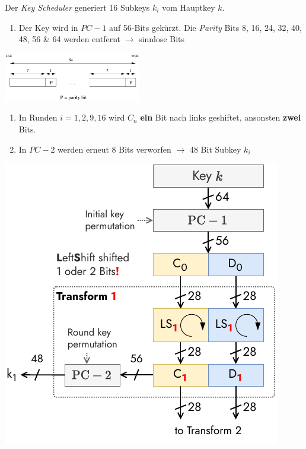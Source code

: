 \documentclass[
  10pt,
  a4paper,
]{article}
\providecommand{\tightlist}{%
  \setlength{\itemsep}{0pt}\setlength{\parskip}{0pt}}\usepackage{longtable,booktabs,array}
\begin{document}
\begin{multicols*}{2}
Der \emph{Key Scheduler} generiert 16 Subkeys \(k_i\) vom Hauptkey
\(k\).

\begin{enumerate}
\def\labelenumi{\arabic{enumi}.}
\tightlist
\item
  Der Key wird in \(PC-1\) auf 56-Bits gekürzt. Die \emph{Parity} Bits
  8, 16, 24, 32, 40, 48, 56 \& 64 werden entfernt \(\rightarrow\)
  sinnlose Bits
\end{enumerate}

\begin{center}
\includegraphics[width=6cm,height=\textheight]{images/crypto/initial_key_permutation.png}
\end{center}

\begin{enumerate}
\def\labelenumi{\arabic{enumi}.}
\setcounter{enumi}{1}
\item
  In Runden \(i=1,2,9,16\) wird \(C_n\) \textbf{ein} Bit nach links
  geshiftet, ansonsten \textbf{zwei} Bits.
\item
  In \(PC-2\) werden erneut 8 Bits verworfen \(\rightarrow\) 48 Bit
  Subkey \(k_i\)
\end{enumerate}

\begin{center}
\includegraphics{images/crypto/keyscheduler.pdf}
\end{center}


\end{multicols*}
\end{document}
